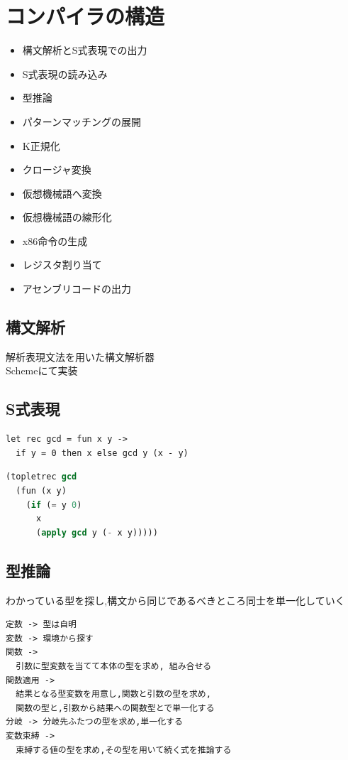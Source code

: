 \documentclass[papersize,30pt,slide]{jsarticle}
\begin{document}
\section{コンパイラの構造}

\begin{itemize}
\item 構文解析とS式表現での出力 
\item S式表現の読み込み
\item 型推論
\item パターンマッチングの展開
\item K正規化
\item クロージャ変換
\item 仮想機械語へ変換
\item 仮想機械語の線形化
\item x86命令の生成
\item レジスタ割り当て
\item アセンブリコードの出力
\end{itemize}

\newpage

\subsection{構文解析}
解析表現文法を用いた構文解析器 \\
Schemeにて実装


\subsection{S式表現}
\begin{lstlisting}
let rec gcd = fun x y ->
  if y = 0 then x else gcd y (x - y)
\end{lstlisting}

\begin{lstlisting}[language=Lisp,columns=fullflexible,morekeywords={topletrec,fun,if},deletekeywords={gcd}]
(topletrec gcd
  (fun (x y)
    (if (= y 0)
      x
      (apply gcd y (- x y)))))
\end{lstlisting}

\newpage
\subsection{型推論}
わかっている型を探し,構文から同じであるべきところ同士を単一化していく
\begin{lstlisting}
定数 -> 型は自明
変数 -> 環境から探す
関数 ->
  引数に型変数を当てて本体の型を求め, 組み合せる
関数適用 ->
  結果となる型変数を用意し,関数と引数の型を求め,
  関数の型と,引数から結果への関数型とで単一化する
分岐 -> 分岐先ふたつの型を求め,単一化する
変数束縛 ->
  束縛する値の型を求め,その型を用いて続く式を推論する
\end{lstlisting}
\end{document}
